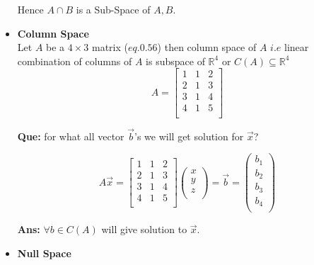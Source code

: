 \documentclass[a4paper,11pt]{article}
\numberwithin{equation}{section}
\begin{document}
\begin{itemize}
Hence $A\cap B$ is a Sub-Space of $A,B$.\\

\item \textbf{Column Space}\\
   
Let $A$ be a $4\times 3$ matrix ($eq.0.56$) then column space of $A$ $i.e$ linear combination of columns of $A$ is subspace of $\mathbb{R}^4$ or $C(A)\subseteq \mathbb{R}^4$\\

\begin{equation}
    A=
    \begin{bmatrix}
        1&1&2\\
        2&1&3\\
        3&1&4\\
        4&1&5\\
    \end{bmatrix}
\end{equation}

\textbf{Que: } for what all vector $\vec{b}$'s we will get solution for $\vec{x}$?

\begin{equation}
    A\vec{x}  =
    \begin{bmatrix}
        1&1&2\\
        2&1&3\\
        3&1&4\\
        4&1&5\\
    \end{bmatrix}
    \begin{pmatrix}
        x\\
        y\\
        z\\
    \end{pmatrix}=\vec{b}=
    \begin{pmatrix}
        b_1\\b_2\\b_3\\b_4\\
    \end{pmatrix}
\end{equation}

\textbf{Ans: }$\forall b\in C(A)$ will give solution to $\vec{x}$.\\

\item \textbf{Null Space}\\


\end{itemize}
\end{document}
